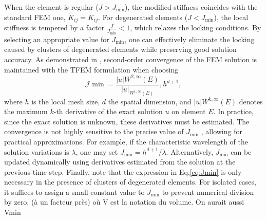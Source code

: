 \documentclass{article}
\newcommand{\J}{J}
\newcommand{\Jmin}{J_{\text{min}}}
\begin{document}
When the element is regular ($\J > \Jmin$), the modified stiffness coincides with the standard FEM one, $\tilde{K}_{ij} = K_{ij}$. For degenerated elements ($\J < \Jmin$), the local stiffness is tempered by a factor $\frac{\J}{\Jmin} <1$, which relaxes the locking conditions. By selecting an appropriate value for $\Jmin$, one can effectively eliminate the locking caused by clusters of degenerated elements while preserving good solution accuracy. As demonstrated in \cite{quiriny2024tempered}, second-order convergence of the FEM solution is maintained with the TFEM formulation when choosing
\begin{equation} \label{eq:Jmin}
\mathcal{J}{\min} =
\frac{|u|{W^{2,\infty}(E)}}{|u|_{W^{1,\infty}(E)}} , h^{d+1},
\end{equation}
where $h$ is the local mesh size, $d$ the spatial dimension, and $|u|{W^{k,\infty}(E)}$ denotes the maximum $k$-th derivative of the exact solution $u$ on element $E$. In practice, since the exact solution is unknown, these derivatives must be estimated. The convergence is not highly sensitive to the precise value of $\Jmin$ \cite{quiriny2024tempered}, allowing for practical approximations. For example, if the characteristic wavelength of the solution variations is $\lambda$, one may set $\Jmin = h^{d+1} / \lambda$. Alternatively, $\Jmin$ can be updated dynamically using derivatives estimated from the solution at the previous time step. Finally, note that the expression in Eq.\eqref{eq:Jmin} is only necessary in the presence of clusters of degenerated elements. For isolated cases, it suffices to assign a small constant value to $\Jmin$ to prevent numerical division by zero.
(à un facteur près) où V est la notation du volume. On aurait aussi Vmin



\fi

\end{document}
